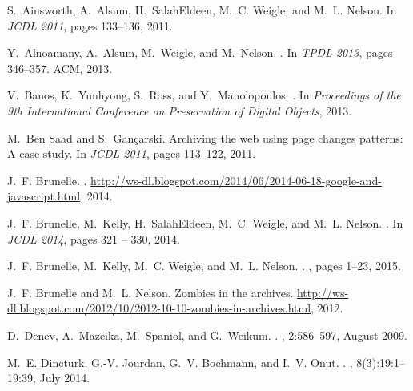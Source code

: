 \documentclass{ipres_proc_article-sp}
\begin{document}

%  
\begin{thebibliography}{10}

S.~Ainsworth, A.~Alsum, H.~SalahEldeen, M.~C. Weigle, and M.~L. Nelson.
\newblock In {\em {JCDL 2011}}, pages 133--136, 2011.

Y.~Alnoamany, A.~Alsum, M.~Weigle, and M.~Nelson.
.
\newblock In {\em {TPDL 2013}}, pages 346--357. ACM, 2013.

V.~Banos, K.~Yunhyong, S.~Ross, and Y.~Manolopoulos.
.
\newblock In {\em Proceedings of the 9th International Conference on
  Preservation of Digital Objects}, 2013.

M.~{Ben Saad} and S.~Gançarski.
\newblock Archiving the web using page changes patterns: A case study.
\newblock In {\em {JCDL 2011}}, pages 113--122, 2011.

J.~F. Brunelle.
.
\newblock
  \url{http://ws-dl.blogspot.com/2014/06/2014-06-18-google-and-javascript.html},
  2014.

J.~F. Brunelle, M.~Kelly, H.~SalahEldeen, M.~C. Weigle, and M.~L. Nelson.
.
\newblock In {\em {JCDL 2014}}, pages 321 -- 330, 2014.

J.~F. Brunelle, M.~Kelly, M.~C. Weigle, and M.~L. Nelson.
.
, pages 1--23, 2015.

J.~F. Brunelle and M.~L. Nelson.
\newblock Zombies in the archives.
\newblock
  \url{http://ws-dl.blogspot.com/2012/10/2012-10-10-zombies-in-archives.html},
  2012.

D.~Denev, A.~Mazeika, M.~Spaniol, and G.~Weikum.
.
, 2:586--597, August 2009.

M.~E. Dincturk, G.-V. Jourdan, G.~V. Bochmann, and I.~V. Onut.
.
, 8(3):19:1--19:39, July 2014.


\end{thebibliography}
\end{document}
